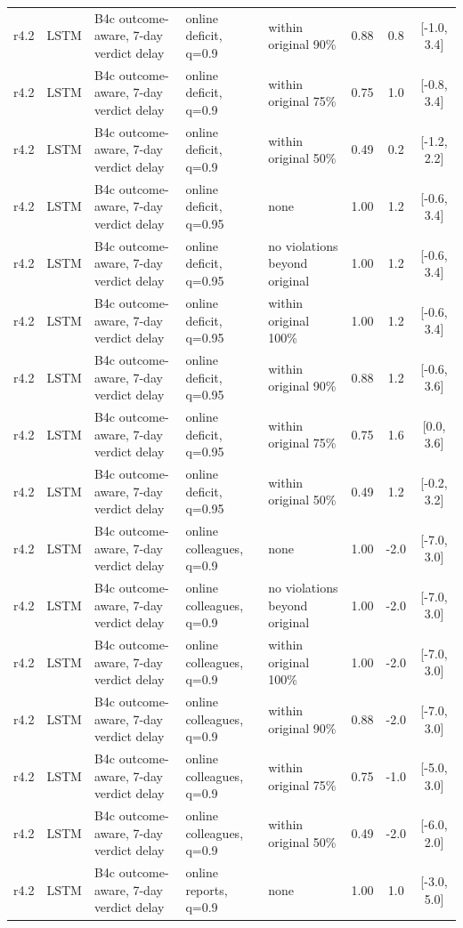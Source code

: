 \documentclass[10pt,onecolumn,letterpaper]{article}
\begin{document}
\begin{longtable}{lllp{4.2cm}p{3.4cm}ccc}
r4.2 & LSTM & B4c outcome-aware, 7-day verdict delay & online deficit, q=0.9 & within original 90\% & 0.88 & 0.8 & [-1.0, 3.4] \\
r4.2 & LSTM & B4c outcome-aware, 7-day verdict delay & online deficit, q=0.9 & within original 75\% & 0.75 & 1.0 & [-0.8, 3.4] \\
r4.2 & LSTM & B4c outcome-aware, 7-day verdict delay & online deficit, q=0.9 & within original 50\% & 0.49 & 0.2 & [-1.2, 2.2] \\
r4.2 & LSTM & B4c outcome-aware, 7-day verdict delay & online deficit, q=0.95 & none & 1.00 & 1.2 & [-0.6, 3.4] \\
r4.2 & LSTM & B4c outcome-aware, 7-day verdict delay & online deficit, q=0.95 & no violations beyond original & 1.00 & 1.2 & [-0.6, 3.4] \\
r4.2 & LSTM & B4c outcome-aware, 7-day verdict delay & online deficit, q=0.95 & within original 100\% & 1.00 & 1.2 & [-0.6, 3.4] \\
r4.2 & LSTM & B4c outcome-aware, 7-day verdict delay & online deficit, q=0.95 & within original 90\% & 0.88 & 1.2 & [-0.6, 3.6] \\
r4.2 & LSTM & B4c outcome-aware, 7-day verdict delay & online deficit, q=0.95 & within original 75\% & 0.75 & 1.6 & [0.0, 3.6] \\
r4.2 & LSTM & B4c outcome-aware, 7-day verdict delay & online deficit, q=0.95 & within original 50\% & 0.49 & 1.2 & [-0.2, 3.2] \\
r4.2 & LSTM & B4c outcome-aware, 7-day verdict delay & online colleagues, q=0.9 & none & 1.00 & -2.0 & [-7.0, 3.0] \\
r4.2 & LSTM & B4c outcome-aware, 7-day verdict delay & online colleagues, q=0.9 & no violations beyond original & 1.00 & -2.0 & [-7.0, 3.0] \\
r4.2 & LSTM & B4c outcome-aware, 7-day verdict delay & online colleagues, q=0.9 & within original 100\% & 1.00 & -2.0 & [-7.0, 3.0] \\
r4.2 & LSTM & B4c outcome-aware, 7-day verdict delay & online colleagues, q=0.9 & within original 90\% & 0.88 & -2.0 & [-7.0, 3.0] \\
r4.2 & LSTM & B4c outcome-aware, 7-day verdict delay & online colleagues, q=0.9 & within original 75\% & 0.75 & -1.0 & [-5.0, 3.0] \\
r4.2 & LSTM & B4c outcome-aware, 7-day verdict delay & online colleagues, q=0.9 & within original 50\% & 0.49 & -2.0 & [-6.0, 2.0] \\
r4.2 & LSTM & B4c outcome-aware, 7-day verdict delay & online reports, q=0.9 & none & 1.00 & 1.0 & [-3.0, 5.0] \\

\end{longtable}
\end{document}

